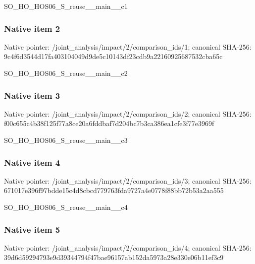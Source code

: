 \documentclass[10pt,a4paper]{article}
\begin{document}
\begingroup\raggedright\sloppy SO\_\allowbreak{}HO\_\allowbreak{}HOS06\_\allowbreak{}S\_\allowbreak{}reuse\_\allowbreak{}\_\allowbreak{}main\_\allowbreak{}\_\allowbreak{}c1\par\endgroup

\subsubsection{Native item 2}
Native pointer: /joint\_\allowbreak{}analysis/impact/2/comparison\_\allowbreak{}ids/1; canonical SHA-256: 9c4f6d3544d17fa403104049d9de5c10143df23cdb9a22160925687532cba65c

\begingroup\raggedright\sloppy SO\_\allowbreak{}HO\_\allowbreak{}HOS06\_\allowbreak{}S\_\allowbreak{}reuse\_\allowbreak{}\_\allowbreak{}main\_\allowbreak{}\_\allowbreak{}c2\par\endgroup

\subsubsection{Native item 3}
Native pointer: /joint\_\allowbreak{}analysis/impact/2/comparison\_\allowbreak{}ids/2; canonical SHA-256: f00c655c4b38f125f77a8ce20a6fddbaf7d204bc7b3ca386ea1cfe3f77e3969f

\begingroup\raggedright\sloppy SO\_\allowbreak{}HO\_\allowbreak{}HOS06\_\allowbreak{}S\_\allowbreak{}reuse\_\allowbreak{}\_\allowbreak{}main\_\allowbreak{}\_\allowbreak{}c3\par\endgroup

\subsubsection{Native item 4}
Native pointer: /joint\_\allowbreak{}analysis/impact/2/comparison\_\allowbreak{}ids/3; canonical SHA-256: 671017e396f97bdde15c4d8cbcd779763fda9727a4e0778f88bb72b53a2aa555

\begingroup\raggedright\sloppy SO\_\allowbreak{}HO\_\allowbreak{}HOS06\_\allowbreak{}S\_\allowbreak{}reuse\_\allowbreak{}\_\allowbreak{}main\_\allowbreak{}\_\allowbreak{}c4\par\endgroup

\subsubsection{Native item 5}
Native pointer: /joint\_\allowbreak{}analysis/impact/2/comparison\_\allowbreak{}ids/4; canonical SHA-256: 39d6d59294793e9d39344794f47bae96157ab152da5973a28e330e06b11ef3c9
\end{document}
